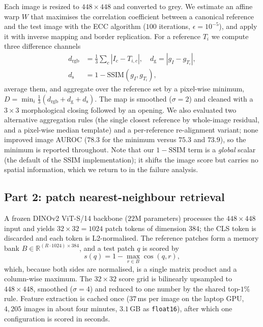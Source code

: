 \documentclass[10pt,twocolumn,letterpaper]{article}
\begin{document}
Each image is resized to $448\times448$ and converted to grey. We estimate an
affine warp $W$ that maximises the correlation coefficient between a canonical
reference and the test image with the ECC algorithm ($100$ iterations,
$\epsilon=10^{-5}$), and apply it with inverse mapping and border replication.
For a reference $T_i$ we compute three difference channels
\begin{equation}
\begin{aligned}
d_{\mathrm{rgb}}&=\tfrac{1}{3}\textstyle\sum_{c}|I_c-T_{i,c}|,\quad
d_{\mathrm{g}}=|g_I-g_{T_i}|,\\
d_{\mathrm{s}}&=1-\mathrm{SSIM}(g_I,g_{T_i}),
\end{aligned}
\end{equation}
average them, and aggregate over the reference set by a pixel-wise minimum,
$D=\min_i \tfrac{1}{3}(d_{\mathrm{rgb}}+d_{\mathrm{g}}+d_{\mathrm{s}})$. The map
is smoothed ($\sigma=2$) and cleaned with a $3\times3$ morphological closing
followed by an opening. We also evaluated two alternative aggregation rules
(the single closest reference by whole-image residual, and a pixel-wise median
template) and a per-reference re-alignment variant; none improved image AUROC
($78.3$ for the minimum versus $75.3$ and $73.9$), so the minimum is reported
throughout. Note that our $1-\mathrm{SSIM}$ term is a \emph{global} scalar (the
default of the SSIM implementation); it shifts the image score but carries no
spatial information, which we return to in the failure analysis.

\subsection{Part 2: patch nearest-neighbour retrieval}

A frozen DINOv2 ViT-S/14 backbone ($22$M parameters) processes the
$448\times448$ input and yields $32\times32=1024$ patch tokens of dimension
$384$; the CLS token is discarded and each token is L2-normalised. The reference
patches form a memory bank $B\in\mathbb{R}^{(R\cdot1024)\times384}$, and a test
patch $q$ is scored by
\begin{equation}
s(q)=1-\max_{r\in B}\cos(q,r),
\end{equation}
which, because both sides are normalised, is a single matrix product and a
column-wise maximum. The $32\times32$ score grid is bilinearly upsampled to
$448\times448$, smoothed ($\sigma=4$) and reduced to one number by the shared
top-$1\%$ rule. Feature extraction is cached once ($37$\,ms per image on the
laptop GPU, $4{,}205$ images in about four minutes, $3.1$\,GB as
\texttt{float16}), after which one configuration is scored in seconds.
\end{document}
